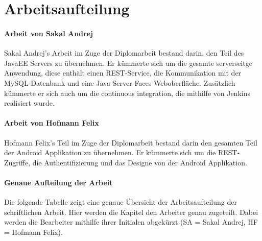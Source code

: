 \chapter*{Arbeitsaufteilung}
\subsubsection{Arbeit von Sakal Andrej}
\begin{normalsize}
Sakal Andrej's Arbeit im Zuge der Diplomarbeit bestand darin, den Teil des JavaEE Servers zu übernehmen. Er kümmerte sich um die gesamte serverseitge Anwendung, diese enthält einen REST-Service, die Kommunikation mit der MySQL-Datenbank und eine Java Server Faces Weboberfläche. Zusätzlich kümmerte er sich auch um die continuous integration, die mithilfe von Jenkins realisiert wurde.
\end{normalsize}

\subsubsection{Arbeit von Hofmann Felix}
\begin{normalsize}
Hofmann Felix's Teil im Zuge der Diplomarbeit bestand darin den gesamten Teil der Android Applikation zu übernehmen. Er kümmerte sich um die REST-Zugriffe, die Authentifizierung und das Designe von der Android Applikation.
\end{normalsize}

\subsubsection{Genaue Aufteilung der Arbeit}
\begin{normalsize}
Die folgende Tabelle zeigt eine genaue Übersicht der Arbeitsaufteilung der schriftlichen Arbeit. Hier werden die Kapitel den Arbeiter genau zugeteilt. Dabei werden die Bearbeiter mithilfe ihrer Initialen abgekürzt (SA = Sakal Andrej, HF = Hofmann Felix).
\end{normalsize}

